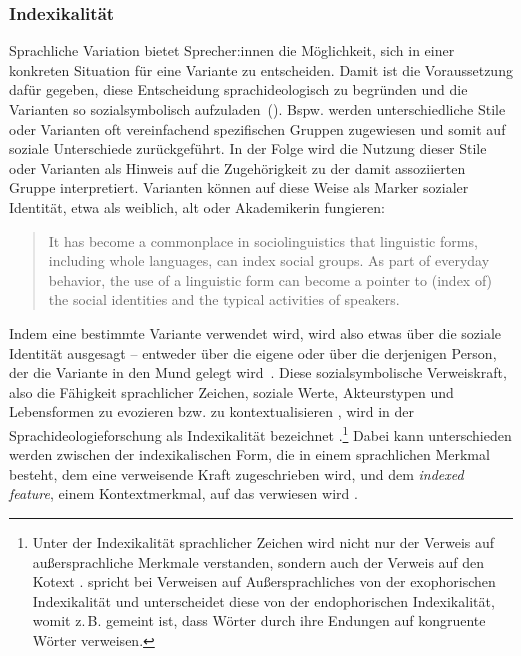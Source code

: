 \subsubsection{Indexikalität}
\label{sec:Indexikalitaet}
Sprachliche Variation bietet Sprecher:innen die M{\"o}glichkeit, sich in einer konkreten Situation f{\"u}r eine Variante zu entscheiden. 
Damit ist die Voraussetzung dafür gegeben, diese Entscheidung sprachideologisch zu begründen und die Varianten so sozialsymbolisch aufzuladen~(\citealp[s. u.\,a.][]{Silverstein1979, HessLuttich2005, Eckert2008, Spitzmuller2013}). 
Bspw. werden unterschiedliche Stile oder Varianten oft vereinfachend spezifischen Gruppen zugewiesen und somit auf soziale Unterschiede zur{\"u}ckgef{\"u}hrt. 
In der Folge wird die Nutzung dieser Stile oder Varianten als Hinweis auf die Zugehörigkeit zu der damit assoziierten Gruppe interpretiert. 
Varianten k{\"o}nnen auf diese Weise als Marker sozialer Identität, etwa als weiblich, alt oder Akademikerin fungieren:
\begin{quote} It has become a commonplace in sociolinguistics that linguistic forms, including whole languages, can index social groups. As part of everyday behavior, the use of a linguistic form can become a pointer to (index of) the social identities and the typical activities of speakers.~\citep[36]{Irvine2000}\end{quote}
Indem eine bestimmte Variante verwendet wird, wird also etwas {\"u}ber die soziale Identit{\"a}t ausgesagt -- entweder über die eigene oder über die derjenigen Person, der die Variante in den Mund gelegt wird~\citep[s.][222]{Silverstein.1985}. 
Diese sozialsymbolische Verweiskraft, also \glqq die Fähigkeit sprachlicher Zeichen, soziale Werte, Akteurstypen und Lebensformen zu evozieren bzw. zu kontextualisieren\grqq{} \citep[265]{Spitzmuller2013}, wird in der Sprachideologieforschung als Indexikalität bezeichnet \citep[s.][]{Silverstein1979,Silverstein2003}.\footnote{Unter der Indexikalität sprachlicher Zeichen wird nicht nur der Verweis auf außersprachliche Merkmale verstanden, sondern auch der Verweis auf den Kotext \citep[s.][6--8]{Auer.1995}. \citet[42]{Auer.1989} spricht bei Verweisen auf Außersprachliches von der exophorischen Indexikalität und unterscheidet diese von der endophorischen Indexikalität, womit z.\,B. gemeint ist, dass Wörter durch ihre Endungen auf kongruente Wörter verweisen.}
Dabei kann unterschieden werden zwischen der indexikalischen Form, die in einem sprachlichen Merkmal besteht, dem eine verweisende Kraft zugeschrieben wird, und dem \textit{indexed feature}, einem Kontextmerkmal, auf das verwiesen wird \citep[s.][2]{Auer.1995}.

